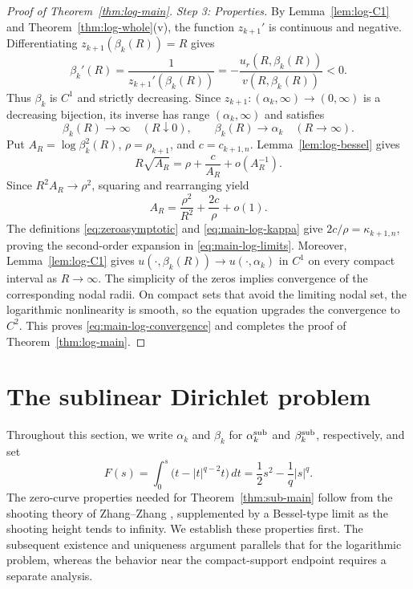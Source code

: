 \documentclass[11pt]{article}
\begin{document}
\begin{proof}[Proof of Theorem~\ref{thm:log-main}]
\medskip
\noindent\emph{Step 3: Properties.}
{
By Lemma~\ref{lem:log-C1} and Theorem~\ref{thm:log-whole}(v),
{the function $z_{k+1}'$ is continuous and negative}. Differentiating
$z_{k+1}(\beta_k(R))=R$ gives
\[
 \beta_k'(R)=\frac{1}{z_{k+1}'(\beta_k(R))}
 =-\frac{u_r(R,\beta_k(R))}{v(R,\beta_k(R))}<0.
\]
Thus $\beta_k$ is $C^1$ and strictly decreasing. Since
$z_{k+1}:(\alpha_k,\infty)\to(0,\infty)$ is a decreasing bijection,
its inverse has range $(\alpha_k,\infty)$ and satisfies
\[
 \beta_k(R)\to\infty\quad(R\downarrow0),
 \qquad
 \beta_k(R)\to\alpha_k\quad(R\to\infty).
\]
Put $A_R=\log\beta_k^2(R)$, $\rho=\rho_{k+1}$, and
$c=c_{k+1,n}$. Lemma~\ref{lem:log-bessel} gives
\[
 R\sqrt{A_R}=\rho+\frac{c}{A_R}+o(A_R^{-1}).
\]
Since $R^2A_R\to\rho^2$, squaring and rearranging yield
\[
 A_R=\frac{\rho^2}{R^2}+\frac{2c}{\rho}+o(1).
\]
The definitions \eqref{eq:zeroasymptotic} and
\eqref{eq:main-log-kappa} give $2c/\rho=\kappa_{k+1,n}$, proving the
second-order expansion in \eqref{eq:main-log-limits}.
Moreover, Lemma~\ref{lem:log-C1} gives
$u(\cdot,\beta_k(R))\to u(\cdot,\alpha_k)$ in $C^1$ on every compact
interval as $R\to\infty$. The simplicity of the zeros implies
convergence of the corresponding nodal radii. On compact sets that
avoid the limiting nodal set, the logarithmic nonlinearity is smooth,
so the equation upgrades the convergence to $C^2$. This proves
\eqref{eq:main-log-convergence} and completes the proof of
Theorem~\ref{thm:log-main}.}
\end{proof}
\section{The sublinear Dirichlet problem}
\label{sec:proof-sub}
Throughout this section, we write $\alpha_k$ and $\beta_k$ for
$\alpha_k^{\rm sub}$ and $\beta_k^{\rm sub}$, respectively, and set
\[
 F(s)=\int_0^s\bigl(t-|t|^{q-2}t\bigr)\,dt
 =\frac12s^2-\frac1q|s|^q.
\]
The zero-curve properties needed for
Theorem~\ref{thm:sub-main} follow from the shooting theory of
Zhang--Zhang \cite{ZhangZhang}, supplemented by a Bessel-type limit
as the shooting height tends to infinity. We establish these
properties first. The subsequent existence and uniqueness argument
parallels that for the logarithmic problem, whereas the behavior near
the compact-support endpoint requires a separate analysis.
\end{document}
